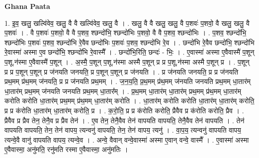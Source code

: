 \documentclass[17pt]{extarticle}
\begin{document}
\textbf{Ghana Paata } \newline

1. इ॒व॒ खलु॒ खल्वि॑वेव॒ खलु॒ वै वै खल्वि॑वेव॒ खलु॒ वै । . खलु॒ वै वै खलु॒ खलु॒ वै प॒शवः॑ प॒शवो॒ वै खलु॒ खलु॒ वै प॒शवः॑ । . वै प॒शवः॑ प॒शवो॒ वै वै प॒शव॒ श्छन्दो॑भि॒ श्छन्दो॑भिः प॒शवो॒ वै वै प॒शव॒ श्छन्दो॑भिः । . प॒शव॒ श्छन्दो॑भि॒ श्छन्दो॑भिः प॒शवः॑ प॒शव॒ श्छन्दो॑भि रे॒वैव छन्दो॑भिः प॒शवः॑ प॒शव॒ श्छन्दो॑भि रे॒व । . छन्दो॑भि रे॒वैव छन्दो॑भि॒ श्छन्दो॑भि रे॒वास्मा॑ अस्मा ए॒व छन्दो॑भि॒ श्छन्दो॑भि रे॒वास्मै᳚ । . छन्दो॑भि॒रिति॒ छन्दः॑ - भिः॒ । . ए॒वास्मा॑ अस्मा ए॒वैवास्मै॑ प॒शून् प॒शू,न॑स्मा ए॒वैवास्मै॑ प॒शून् । . अ॒स्मै॒ प॒शून् प॒शू,न॑स्मा अस्मै प॒शून् प्र प्र प॒शू,न॑स्मा अस्मै प॒शून् प्र । . प॒शून् प्र प्र प॒शून् प॒शून् प्र ज॑नयति जनयति॒ प्र प॒शून् प॒शून् प्र ज॑नयति । . प्र ज॑नयति जनयति॒ प्र प्र ज॑नयति प्रथ॒मम् प्र॑थ॒मम् ज॑नयति॒ प्र प्र ज॑नयति प्रथ॒मम् । . ज॒न॒य॒ति॒ प्र॒थ॒मम् प्र॑थ॒मम् ज॑नयति जनयति प्रथ॒मम् धा॒तार॑म् धा॒तार॑म् प्रथ॒मम् ज॑नयति 
जनयति प्रथ॒मम् धा॒तार᳚म् । . प्र॒थ॒मम् धा॒तार॑म् धा॒तार॑म् प्रथ॒मम् प्र॑थ॒मम् धा॒तार॑म् करोति करोति धा॒तार॑म् प्रथ॒मम् प्र॑थ॒मम् धा॒तार॑म् करोति । . धा॒तार॑म् करोति करोति धा॒तार॑म् धा॒तार॑म् करोति॒ प्र प्र क॑रोति धा॒तार॑म् धा॒तार॑म् करोति॒ प्र । . क॒रो॒ति॒ प्र प्र क॑रोति करोति॒ प्रैवैव प्र क॑रोति करोति॒ प्रैव । . प्रैवैव प्र प्रैव तेन॒ तेनै॒व प्र प्रैव तेन॑ । . ए॒व तेन॒ तेनै॒वैव तेन॑ वापयति वापयति॒ तेनै॒वैव तेन॑ वापयति । . तेन॑ वापयति वापयति॒ तेन॒ तेन॑ वापय॒ त्यन्वनु॑ वापयति॒ तेन॒ तेन॑ वापय॒ त्यनु॑ । . वा॒प॒य॒ त्यन्वनु॑ वापयति वापय॒ त्यन्वे॒वै वानु॑ वापयति वापय॒ त्यन्वे॒व । . अन्वे॒ वैवान् वन्वे॒वास्मा॑ अस्मा ए॒वान् वन्वे॒ वास्मै᳚ । . ए॒वास्मा॑ अस्मा ए॒वैवास्मा॒ अनु॑मति॒ रनु॑मति रस्मा ए॒वैवास्मा॒ अनु॑मतिः । \newline
\end{document}
